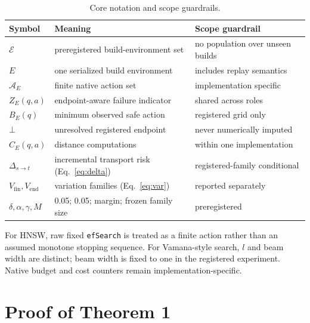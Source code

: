 \documentclass{article}
\newcommand{\Acal}{\mathcal{A}}
\newcommand{\Ecal}{\mathcal{E}}
\newcommand{\BOT}{\bot}
\begin{document}
\begin{table}[h]
\centering
\caption{Core notation and scope guardrails.}
\small
\begin{tabular}{lll}
\toprule
Symbol & Meaning & Scope guardrail \\
\midrule
$\Ecal$ & preregistered build-environment set & no population over unseen builds \\
$E$ & one serialized build environment & includes replay semantics \\
$\Acal_E$ & finite native action set & implementation specific \\
$Z_E(q,a)$ & endpoint-aware failure indicator & shared across roles \\
$B_E(q)$ & minimum observed safe action & registered grid only \\
$\BOT$ & unresolved registered endpoint & never numerically imputed \\
$C_E(q,a)$ & distance computations & within one implementation \\
$\Delta_{s\to t}$ & incremental transport risk (Eq.~\ref{eq:delta}) & registered-family conditional \\
$V_{\mathrm{fin}},V_{\mathrm{end}}$ & variation families (Eq.~\ref{eq:var}) & reported separately \\
$\delta,\alpha,\gamma,M$ & 0.05; 0.05; margin; frozen family size & preregistered \\
\bottomrule
\end{tabular}
\end{table}

For HNSW, raw fixed \texttt{efSearch} is treated as a finite action rather than an assumed monotone
stopping sequence. For Vamana-style search, $l$ and beam width are distinct; beam width is fixed to one in
the registered experiment. Native budget and cost counters remain implementation-specific.

\section{Proof of Theorem 1}
\label{app:proof1}
\end{document}
